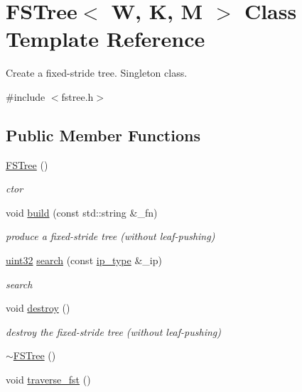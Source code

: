 \hypertarget{classFSTree}{\section{F\-S\-Tree$<$ W, K, M $>$ Class Template Reference}
\label{classFSTree}
}


Create a fixed-\/stride tree. Singleton class.  




{\ttfamily \#include $<$fstree.\-h$>$}

\subsection*{Public Member Functions}
\begin{DoxyCompactItemize}
\item 
\hyperlink{classFSTree_a4cd68e55ea6913813275c7c32174990d}{F\-S\-Tree} ()
\begin{DoxyCompactList}\small\item\em ctor \end{DoxyCompactList}\item 
void \hyperlink{classFSTree_a517a873bdf8ac3eceb092aa927a6cb38}{build} (const std\-::string \&\-\_\-fn)
\begin{DoxyCompactList}\small\item\em produce a fixed-\/stride tree (without leaf-\/pushing) \end{DoxyCompactList}\item 
\hyperlink{types_8h_abd01e8e67e3d94cab04ecaaf4f85ac1b}{uint32} \hyperlink{classFSTree_ab58f1283d0964663ea7130ef62f62d01}{search} (const \hyperlink{classFSTree_a4766ee89821315425e2c6090bd0a0245}{ip\-\_\-type} \&\-\_\-ip)
\begin{DoxyCompactList}\small\item\em search \end{DoxyCompactList}\item 
void \hyperlink{classFSTree_ae2c6117d7c6b1a610afa8dcd52ec842b}{destroy} ()
\begin{DoxyCompactList}\small\item\em destroy the fixed-\/stride tree (without leaf-\/pushing) \end{DoxyCompactList}\item 
\hyperlink{classFSTree_a74f4c744e51813f50ba92cc7f9fabd4f}{$\sim$\-F\-S\-Tree} ()
\item 
void \hyperlink{classFSTree_a491e07546a9fe1ee8d0c03d9ff4ef724}{traverse\-\_\-fst} ()

\end{DoxyCompactItemize}
